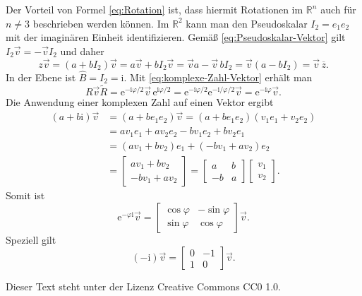\documentclass[a4paper,fleqn,11pt,dvipdfmx]{scrartcl}
\newcommand{\R}{\mathbb R}
\newcommand{\ui}{\mathrm i}
\newcommand{\ee}{\mathrm e}
\begin{document}

\noindent
Der Vorteil von Formel \eqref{eq:Rotation} ist, dass hiermit
Rotationen im $\R^n$ auch für $n\ne 3$ beschrieben werden können.
Im $\R^2$ kann man den Pseudoskalar $I_2=e_1e_2$ mit der
imaginären Einheit identifizieren. Gemäß \eqref{eq:Pseudoskalar-Vektor}
gilt $I_2\vec v=-\vec vI_2$ und daher
\begin{equation}\label{eq:komplexe-Zahl-Vektor}
z\vec v = (a+bI_2)\vec v = a\vec v+bI_2\vec v
= \vec v a -\vec v\,bI_2 = \vec v(a-bI_2) = \vec v\,\overline z.
\end{equation}
In der Ebene ist $\hat B=I_2=\ui$. Mit \eqref{eq:komplexe-Zahl-Vektor}
erhält man
\begin{equation}
R\vec v\tilde R = \ee^{-\ui\varphi/2}\vec v\,\ee^{\ui\varphi/2}
= \ee^{-\ui\varphi/2}\ee^{-\ui/\varphi/2}\vec v
= \ee^{-\ui\varphi}\vec v.
\end{equation}
Die Anwendung einer komplexen Zahl auf einen Vektor ergibt
\begin{align}
(a+b\ui)\vec v &= (a+be_1e_2)\vec v = (a+be_1e_2)(v_1e_1+v_2e_2)\\
&= av_1 e_1 + av_2 e_2 - bv_1 e_2 + bv_2 e_1\\
&= (av_1+bv_2)e_1+(-bv_1+av_2)e_2\\
&= \begin{bmatrix}
av_1+bv_2\\
-bv_1+av_2
\end{bmatrix}
= \begin{bmatrix}
a & b\\
-b & a
\end{bmatrix}\begin{bmatrix}
v_1\\ v_2
\end{bmatrix}.
\end{align}
Somit ist
\begin{equation}
\ee^{-\varphi\ui}\vec v = \begin{bmatrix}
\cos\varphi & -\sin\varphi\\
\sin\varphi & \cos\varphi
\end{bmatrix}\vec v.
\end{equation}
Speziell gilt
\begin{equation}
(-\ui)\vec v = \begin{bmatrix}
0 & -1\\
1 & 0
\end{bmatrix}\vec v.
\end{equation}

\vfill\noindent
{\small Dieser Text steht unter der Lizenz
Creative Commons CC0 1.0.}
\end{document}
